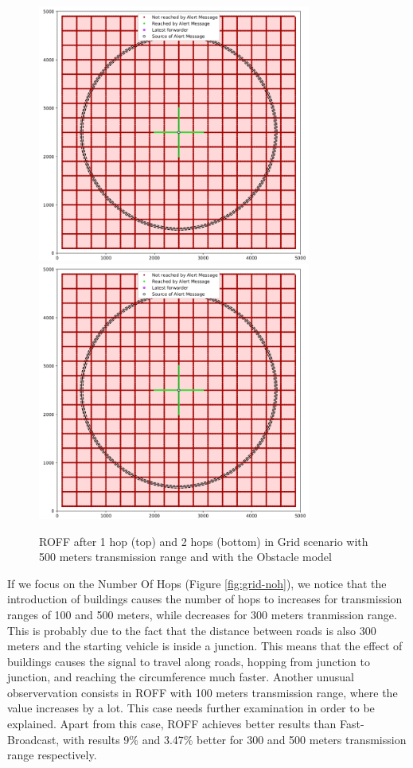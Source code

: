 		\begin{figure}[H]
			\centering
			\includegraphics[width=0.8\textwidth]{immagini/grid-300/b1/fb-1hop}
			\includegraphics[width=0.8\textwidth]{immagini/grid-300/b1/fb-1hop}
			\caption{ROFF after 1 hop (top) and 2 hops (bottom) in Grid scenario with 500 meters transmission range and with the Obstacle model}
			\label{fig:roff-b1-grid-transmission} %
		\end{figure}
		
		If we focus on the Number Of Hops (Figure \ref{fig:grid-noh}), we notice that the introduction of buildings causes the number of hops to increases for transmission ranges of 100 and 500 meters, while decreases for 300 meters tranmission range. This is probably due to the fact that the distance between roads is also 300 meters and the starting vehicle is inside a junction. This means that the effect of buildings causes the signal to travel along roads, hopping from junction to junction, and reaching the circumference much faster. Another unusual observervation consists in ROFF with 100 meters transmission range, where the value increases by a lot. This case needs further examination in order to be explained. Apart from this case, ROFF achieves better results than Fast-Broadcast, with results 9\% and 3.47\% better for 300 and 500 meters transmission range respectively. 
		
